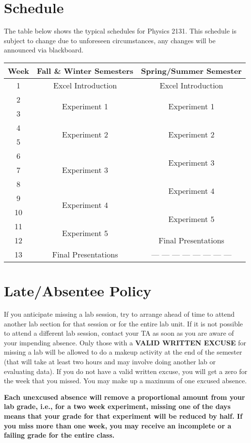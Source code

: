 \section*{Schedule}
The table below shows the typical schedules for Physics 2131.
This schedule is subject to change due to unforeseen circumstances, any changes will be announced via blackboard.
\begin{table}[ht]
	\centering
	\begin{tabular}{ |c|c|c| } 
	 \hline
	 \textbf{Week} & \textbf{Fall \& Winter Semesters} & \textbf{Spring/Summer Semester} \\ 
	 \hline
	 1 & Excel Introduction & Excel Introduction \\ 
	 \hline 
	 2 & \multirow{2}{*}{Experiment 1} & \multirow{2}{*}{Experiment 1} \\ 
	 \cline{1-1}
	 3 &  &  \\ 
	 \hline
	 4 & \multirow{2}{*}{Experiment 2} & \multirow{2}{*}{Experiment 2} \\ 
	 \cline{1-1}
	 5 &  &  \\ 
	 \hline
	 6 & \multirow{3}{*}{Experiment 3} & \multirow{2}{*}{Experiment 3} \\ 
	 \cline{1-1}
	 7 & &  \\ 
	 \cline{1-1} \cline{3-3}
	 8 &  & \multirow{2}{*}{Experiment 4} \\ 
	 \cline{1-2}
	 9 & \multirow{2}{*}{Experiment 4} &  \\ 
	 \cline{1-1} \cline{3-3}
	 10 &  & \multirow{2}{*}{Experiment 5} \\ 
	 \cline{1-2}
	 11 & \multirow{2}{*}{Experiment 5} &  \\ 
	 \cline{1-1} \cline{3-3}
	 12 &  & Final Presentations \\ 
	 \hline
	 13 & Final Presentations & --- --- --- --- --- --- --- --- \\ 
	 \hline
	\end{tabular}
\end{table}

\section*{Late/Absentee Policy}
If you anticipate missing a lab session, try to arrange ahead of time to attend another lab section for that session or for the entire lab unit.
If it is not possible to attend a different lab session, contact your TA as soon as you are aware of your impending absence.
Only those with a \textbf{VALID WRITTEN EXCUSE} for missing a lab will be allowed to do a makeup activity at the end of the semester (that will take at least two hours and may involve doing another lab or evaluating data).
If you do not have a valid written excuse, you will get a zero for the week that you missed.
You may make up a maximum of one excused absence.
\par
\textbf{Each unexcused absence will remove a proportional amount from your lab grade, i.e., for a two week experiment, missing one of the days means that your grade for that experiment will be reduced by half.
If you miss more than one week, you may receive an incomplete or a failing grade for the entire class.}

